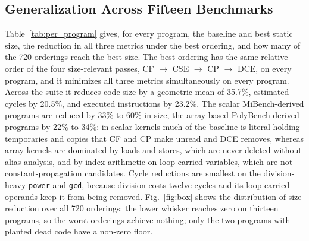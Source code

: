 \documentclass[conference]{IEEEtran}
\begin{document}
\subsection{Generalization Across Fifteen Benchmarks}
\label{sec:classes}
Table~\ref{tab:per_program} gives, for every program, the baseline and best static size, the reduction in all three metrics under the best ordering, and how many of the 720 orderings reach the best size. The best ordering has the same relative order of the four size-relevant passes, CF $\to$ CSE $\to$ CP $\to$ DCE, on every program, and it minimizes all three metrics simultaneously on every program. Across the suite it reduces code size by a geometric mean of 35.7\%, estimated cycles by 20.5\%, and executed instructions by 23.2\%. The scalar MiBench-derived programs are reduced by 33\% to 60\% in size, the array-based PolyBench-derived programs by 22\% to 34\%: in scalar kernels much of the baseline is literal-holding temporaries and copies that CF and CP make unread and DCE removes, whereas array kernels are dominated by loads and stores, which are never deleted without alias analysis, and by index arithmetic on loop-carried variables, which are not constant-propagation candidates. Cycle reductions are smallest on the division-heavy \texttt{power} and \texttt{gcd}, because division costs twelve cycles and its loop-carried operands keep it from being removed. Fig.~\ref{fig:box} shows the distribution of size reduction over all 720 orderings: the lower whisker reaches zero on thirteen programs, so the worst orderings achieve nothing; only the two programs with planted dead code have a non-zero floor.
\end{document}
